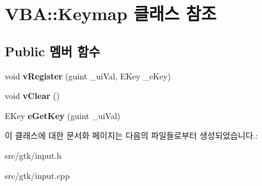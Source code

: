 \hypertarget{class_v_b_a_1_1_keymap}{}\section{V\+BA\+:\+:Keymap 클래스 참조}
\label{class_v_b_a_1_1_keymap}
\subsection*{Public 멤버 함수}
\begin{DoxyCompactItemize}
\item 
\mbox{\label{class_v_b_a_1_1_keymap_a016d13905248b39677f9be0382616d79}} 
void {\bfseries v\+Register} (guint \+\_\+ui\+Val, E\+Key \+\_\+e\+Key)
\item 
\mbox{\label{class_v_b_a_1_1_keymap_a3ab4ca7dcf977067ab7ce631fe6aab57}} 
void {\bfseries v\+Clear} ()
\item 
\mbox{\label{class_v_b_a_1_1_keymap_a486ec30d582382b892c6e81588baa03c}} 
E\+Key {\bfseries e\+Get\+Key} (guint \+\_\+ui\+Val)
\end{DoxyCompactItemize}


이 클래스에 대한 문서화 페이지는 다음의 파일들로부터 생성되었습니다.\+:\begin{DoxyCompactItemize}
\item 
src/gtk/input.\+h\item 
src/gtk/input.\+cpp\end{DoxyCompactItemize}
